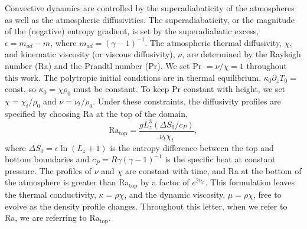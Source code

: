 \documentclass[aps, prl, twocolumn, nofootinbib, groupedaddress, amsfonts, amssymb, amsmath]{revtex4-1}
\begin{document}
Convective dynamics are controlled by the superadiabaticity
of the atmospheres as well as the atmospheric diffusivities.
The superadiabaticity, or the magnitude of the (negative) 
entropy gradient, is set by 
the superadiabatic excess, $\epsilon = m_{ad} - m$, where 
$m_{ad} = (\gamma - 1)^{-1}$.
The atmospheric thermal diffusivity, $\chi$,
and kinematic viscosity (or viscous diffusivity), $\nu$,
are determined by the Rayleigh number (Ra) and the Prandtl
number (Pr).  We set $\text{Pr } = \nu/\chi = 1$ throughout
this work. The polytropic initial conditions are in
thermal equilibrium, $\kappa_0 \partial_z T_0 =$ const,
so $\kappa_0 = \chi \rho_0$ must be constant. To keep
Pr constant with height, we set $\chi = \chi_t/\rho_0$
and $\nu = \nu_t/\rho_0$.  Under these constraints, the
diffusivity profiles are specified by choosing Ra
at the top of the domain,
\begin{equation}
\text{Ra}_{\text{top}} = \frac{g L_z^3 (\Delta S_0 / c_P)}{\nu_t\chi_t},
\end{equation}
where $\Delta S_0 = \epsilon\ln (L_z + 1)$ is the entropy difference 
between the top and bottom boundaries and
$c_P = R\gamma(\gamma-1)^{-1}$ is the specific heat 
at constant pressure. The profiles of $\nu$ and $\chi$ are constant with
time, and Ra at the bottom of the atmosphere is greater than Ra$_{\text{top}}$
by a factor of $e^{2n_{\rho}}$.  This formulation leaves
the thermal conductivity, $\kappa = \rho\chi$, and
the dynamic viscosity, $\mu = \rho\chi$, free to evolve
as the density profile changes.  Throughout this letter,
when we refer to Ra, we are referring to Ra$_{\text{top}}$.
\end{document}
